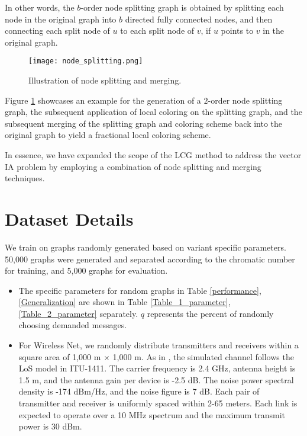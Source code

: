 \documentclass[a4paper,journal]{IEEEtran}
\begin{document}
In other words, the $b$-order node splitting graph is obtained by splitting each node in the original graph into $b$ directed fully connected nodes, and then connecting each split node of $u$ to each split node of $v$, if $u$ points to $v$ in the original graph. 

\begin{figure}[htbp]
	\begin{center}
		\texttt{[image: node\_splitting.png]}
	\end{center}
	\caption{Illustration of node splitting and merging.}
	\label{node_splitting_picture}
\end{figure}

Figure \ref{node_splitting_picture} showcases an example for the generation of a $2$-order node splitting graph, the subsequent application of local coloring on the splitting graph, and the subsequent merging of the splitting graph and coloring scheme back into the original graph to yield a fractional local coloring scheme. 

In essence, we have expanded the scope of the LCG method to address the vector IA problem by employing a combination of node splitting and merging techniques.


\section{Dataset Details}\label{Dataset_Details}
We train on graphs randomly generated based on variant specific parameters. 50,000 graphs were generated and separated according to the chromatic number for training, and 5,000 graphs for evaluation.
\begin{itemize}
    \item  The specific parameters for random graphs in Table \ref{performance},
    \ref{Generalization} are shown in Table \ref{Table_1_parameter}, \ref{Table_2_parameter} separately. $q$ represents the percent of randomly choosing demanded messages.
    
    \item For Wireless Net, we randomly distribute transmitters and receivers within a square area of 1,000 m $\times$ 1,000 m.  As in \cite{yi2015itlinq+}, the simulated channel follows the LoS model in ITU-1411. The carrier frequency is 2.4 GHz, antenna height is 1.5 m, and the antenna gain per device is -2.5 dB. The noise power spectral density is -174 dBm/Hz, and the noise figure is 7 dB. Each pair of transmitter and receiver is uniformly spaced within 2-65 meters. Each link is expected to operate over a 10 MHz spectrum and the maximum transmit power is 30 dBm. 
\end{itemize}
 
\end{document}
